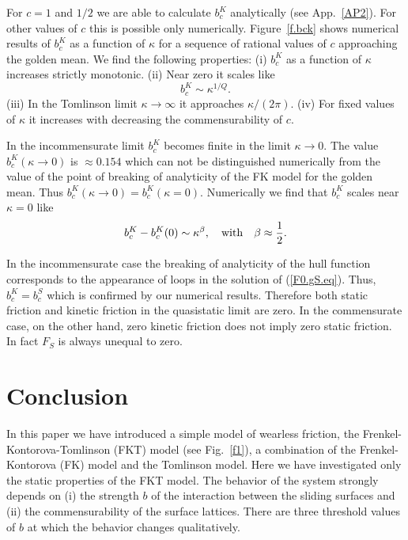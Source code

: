 For $c=1$ and $1/2$ we are able to calculate $b_c^K$ analytically 
(see App.~\ref{AP2}). For other values of $c$ this is possible only
numerically. Figure~\ref{f.bck} shows numerical results of $b_c^K$ 
as a function of $\kappa$ for a sequence of rational values of $c$ 
approaching the golden mean. We find the following properties: (i) 
$b_c^K$ as a function of $\kappa$ increases strictly monotonic. 
(ii) Near zero it scales like
\begin{equation}
  b_c^K\sim \kappa^{1/Q}.
\end{equation}
(iii) In the Tomlinson limit $\kappa\to\infty$ it approaches 
$\kappa/(2\pi)$. (iv) For fixed values of $\kappa$ it increases 
with decreasing the commensurability of $c$. 

In the incommensurate limit $b_c^K$ becomes finite in the 
limit $\kappa\to 0$. The value $b_c^K(\kappa\to 0)$ is $\approx 0.154$ 
which can not be distinguished numerically from the value of the
point of breaking of analyticity of the FK model for the golden 
mean\cite{pey.83}. Thus $b_c^K(\kappa\to 0)=b_c^K(\kappa=0)$. 
Numerically we find that $b_c^K$ scales near $\kappa=0$ like
\begin{equation}
 b_c^K-b_c^K(0)\sim \kappa^\beta,\quad{\rm with}\quad
   \beta\approx\frac{1}{2}.
 \label{KIN.bck}
\end{equation}

In the incommensurate case the breaking of analyticity of the hull
function corresponds to the appearance of loops in the solution of
(\ref{F0.gS.eq}).  Thus, $b_c^K=b_c^S$ which is confirmed by our
numerical results.  Therefore both static friction and kinetic
friction in the quasistatic limit are zero. In the commensurate case,
on the other hand, zero kinetic friction does not imply zero static
friction. In fact $F_S$ is always unequal to zero.

\section{\protect\label{CON}Conclusion}

In this paper we have introduced a simple model of wearless friction,
the Frenkel-Kontorova-Tomlinson (FKT) model (see Fig.~\ref{f1}),
a combination of the Frenkel-Kontorova (FK) model and the 
Tomlinson model. Here we have investigated only the static properties
of the FKT model. The behavior of the system strongly depends on (i) 
the strength $b$ of the interaction between the sliding surfaces and 
(ii) the commensurability of the surface lattices. There are three 
threshold values of $b$ at which the behavior changes qualitatively. 

